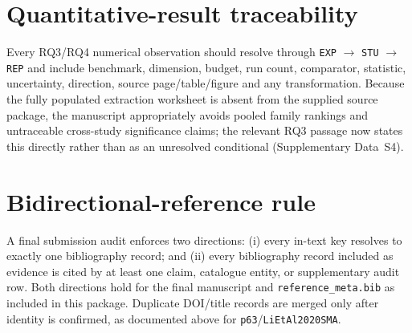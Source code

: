 \documentclass[9pt]{article}
\begin{document}
\section*{Quantitative-result traceability}
Every RQ3/RQ4 numerical observation should resolve through \texttt{EXP} $\rightarrow$ \texttt{STU} $\rightarrow$ \texttt{REP} and include benchmark, dimension, budget, run count, comparator, statistic, uncertainty, direction, source page/table/figure and any transformation. Because the fully populated extraction worksheet is absent from the supplied source package, the manuscript appropriately avoids pooled family rankings and untraceable cross-study significance claims; the relevant RQ3 passage now states this directly rather than as an unresolved conditional (Supplementary Data~S4).

\section*{Bidirectional-reference rule}
A final submission audit enforces two directions: (i) every in-text key resolves to exactly one bibliography record; and (ii) every bibliography record included as evidence is cited by at least one claim, catalogue entity, or supplementary audit row. Both directions hold for the final manuscript and \texttt{reference\_meta.bib} as included in this package. Duplicate DOI/title records are merged only after identity is confirmed, as documented above for \texttt{p63}/\texttt{LiEtAl2020SMA}.
\end{document}
